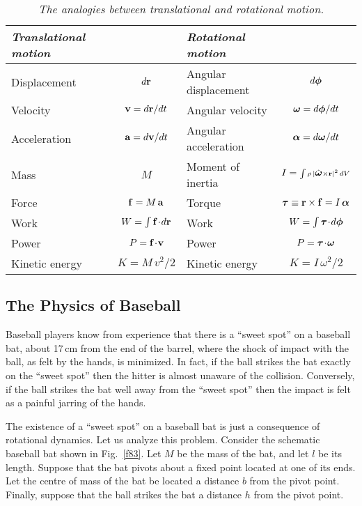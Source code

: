 \begin{table}
\centering
\begin{tabular}{lclc}\hline
{\em Translational motion} & & {\em Rotational motion} &\\[0.5ex] \hline
Displacement & $d{\bf r}$ & Angular displacement & $d\mbox{\boldmath$\phi$}$ \\[0.5ex]
Velocity     & ${\bf v} = d{\bf r}/dt$ & Angular velocity & $\mbox{\boldmath$\omega$} = d\mbox{\boldmath$\phi$}/dt$ \\[0.5ex]
Acceleration & ${\bf a} = d{\bf v}/dt$ & Angular acceleration & $\mbox{\boldmath$\alpha$} = d\mbox{\boldmath$\omega$}/dt$ \\[0.5ex]
Mass & $M$ & Moment of inertia & $I = 
{\scriptstyle\int \rho\, |\hat{\mbox{\boldmath$\omega$}}\times {\bf r}|^2\,dV}$ \\[0.5ex]
Force & ${\bf f} = M\,{\bf a}$ & Torque & $\mbox{\boldmath$\tau$} \equiv{\bf r}\times {\bf f}= I\,\mbox{\boldmath$\alpha$}$ \\[0.5ex]
Work & $W = \int {\bf f}\!\cdot\!d{\bf r}$ & Work & $W = \int \mbox{\boldmath$\tau$}\!\cdot\!d\mbox{\boldmath$\phi$}$ \\[0.5ex]
Power & $P = {\bf f}\!\cdot\!{\bf v}$ & Power & $P = \mbox{\boldmath$\tau$}\!\cdot\!\mbox{\boldmath$\omega$}$ \\[0.5ex]
Kinetic energy & $K = M\,v^2/2$ & Kinetic energy & $K = I\,\omega^2/2$ \\[0.5ex]
 \hline
\end{tabular}
\caption{\em The analogies between translational and rotational motion.}\label{tt1}
\end{table}

\subsection{The Physics of Baseball}
Baseball players know from experience that there is a ``sweet spot'' on a baseball bat, about
17\,cm from the end of the barrel, where the shock of impact with the ball, as felt
by the hands, is minimized. In fact, if the ball strikes the bat exactly on the ``sweet spot'' then the
hitter is almost unaware of the collision. Conversely, if the ball strikes the bat well
away from the ``sweet spot'' then the impact is felt as a painful jarring of the hands.

The existence of a ``sweet spot'' on a baseball bat is just a consequence of rotational dynamics.
Let us analyze this problem. Consider the schematic baseball bat shown in Fig.~\ref{f83}. Let $M$
be the mass of the bat, and let $l$ be its length. Suppose that the bat pivots about a fixed
point located at one of its ends. Let the centre of mass of the bat be located a
distance $b$ from the pivot point. Finally, suppose that the ball strikes the
bat a distance $h$ from the pivot point. 

